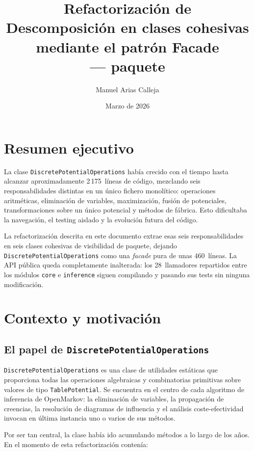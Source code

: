 \documentclass[11pt,a4paper]{article}
\title{Refactorizaci\'on de \code{DiscretePotentialOperations}\\
       \large Descomposici\'on en clases cohesivas mediante el patr\'on Facade\\[4pt]
       \normalsize \code{org.openmarkov.core} --- paquete \code{potential.operation}}
\author{Manuel Arias Calleja}
\date{Marzo de 2026}
\newcommand{\code}[1]{\texttt{#1}}
\begin{document}
\maketitle
\tableofcontents
\newpage

\section*{Resumen ejecutivo}

La clase \code{DiscretePotentialOperations} hab\'ia crecido con el tiempo hasta
alcanzar aproximadamente 2\,175~l\'ineas de c\'odigo, mezclando seis
responsabilidades distintas en un \'unico fichero monol\'itico: operaciones
aritm\'eticas, eliminaci\'on de variables, maximizaci\'on, fusi\'on de potenciales,
transformaciones sobre un \'unico potencial y m\'etodos de f\'abrica.  Esto
dificultaba la navegaci\'on, el testing aislado y la evoluci\'on futura del c\'odigo.

La refactorizaci\'on descrita en este documento extrae esas seis responsabilidades
en seis clases cohesivas de visibilidad de paquete, dejando
\code{DiscretePotentialOperations} como una \emph{facade} pura de unas 460~l\'ineas.
La API p\'ublica queda completamente inalterada: los 28~llamadores repartidos entre
los m\'odulos \code{core} e \code{inference} siguen compilando y pasando sus tests
sin ninguna modificaci\'on.

\section{Contexto y motivaci\'on}

\subsection{El papel de \code{DiscretePotentialOperations}}

\code{DiscretePotentialOperations} es una clase de utilidades est\'aticas que
proporciona todas las operaciones algebraicas y combinatorias primitivas sobre
valores de tipo \code{TablePotential}.  Se encuentra en el centro de cada
algoritmo de inferencia de OpenMarkov: la eliminaci\'on de variables, la
propagaci\'on de creencias, la resoluci\'on de diagramas de influencia y el
an\'alisis coste-efectividad invocan en \'ultima instancia uno o varios de sus
m\'etodos.

Por ser tan central, la clase hab\'ia ido acumulando m\'etodos a lo largo de los
a\~nos.  En el momento de esta refactorizaci\'on conten\'ia:
\end{document}
